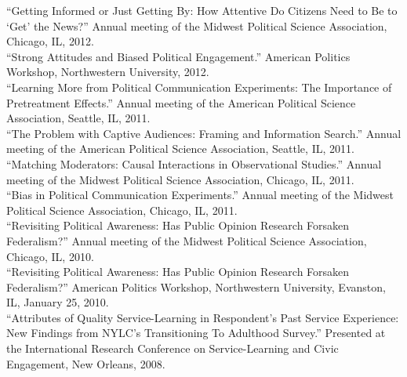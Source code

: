 \documentclass[12pt]{article}
\newcommand{\entry}[1]{\indent {\color{lg}\guillemotright}\hspace{2pt}#1\vspace{.25em}\\}
\begin{document}
\entry{``Getting Informed or Just Getting By: How Attentive Do Citizens Need to Be to `Get' the News?'' Annual meeting of the Midwest Political Science Association, Chicago, IL, 2012.}
\entry{``Strong Attitudes and Biased Political Engagement.'' American Politics Workshop, Northwestern University, 2012.}
\entry{``Learning More from Political Communication Experiments: The Importance of Pretreatment Effects.'' Annual meeting of the American Political Science Association, Seattle, IL, 2011.}
\entry{``The Problem with Captive Audiences: Framing and Information Search.'' Annual meeting of the American Political Science Association, Seattle, IL, 2011.}
\entry{``Matching Moderators: Causal Interactions in Observational Studies.'' Annual meeting of the Midwest Political Science Association, Chicago, IL, 2011.}
\entry{``Bias in Political Communication Experiments.'' Annual meeting of the Midwest Political Science Association, Chicago, IL, 2011.}
\entry{``Revisiting Political Awareness: Has Public Opinion Research Forsaken Federalism?'' Annual meeting of the Midwest Political Science Association, Chicago, IL, 2010.}
\entry{``Revisiting Political Awareness: Has Public Opinion Research Forsaken Federalism?'' American Politics Workshop, Northwestern University, Evanston, IL, January 25, 2010.}
\entry{``Attributes of Quality Service-Learning in Respondent's Past Service Experience: New Findings from NYLC's Transitioning To Adulthood Survey.'' Presented at the International Research Conference on Service-Learning and Civic Engagement, New Orleans, 2008.}
\end{document}
